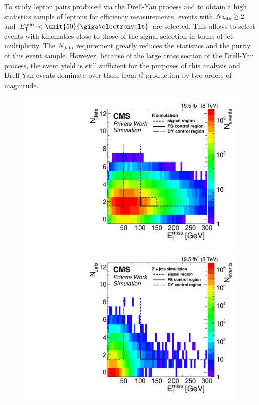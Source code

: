 To study lepton pairs produced via the Drell-Yan process and to obtain a high statistics sample of leptons for efficiency measurements, events with $N_\text{Jets} \geq 2$ and $\MET < \unit{50}{\giga\electronvolt}$ are selected. This allows to select events with kinematics close to those of the signal selection in terms of jet multiplicity. The $N_\text{Jets}$ requirement greatly reduces the statistics and the purity of this event sample. However, because of the large cross section of the Drell-Yan process, the event yield is still sufficient for the purposes of this analysis and Drell-Yan events dominate over those from $t\bar{t}$ production by two orders of magnitude.
\begin{figure}[htbp]
\centering
\begin{minipage}[t]{0.49\textwidth}
  \includegraphics[width=\textwidth]{plots/SELECTION/metJetsScatter_ttbar.pdf}
\end{minipage}
\begin{minipage}[t]{0.49\textwidth}
\includegraphics[width=\textwidth]{plots/SELECTION/metJetsScatter_DY.pdf}

\end{minipage}
\end{figure}

